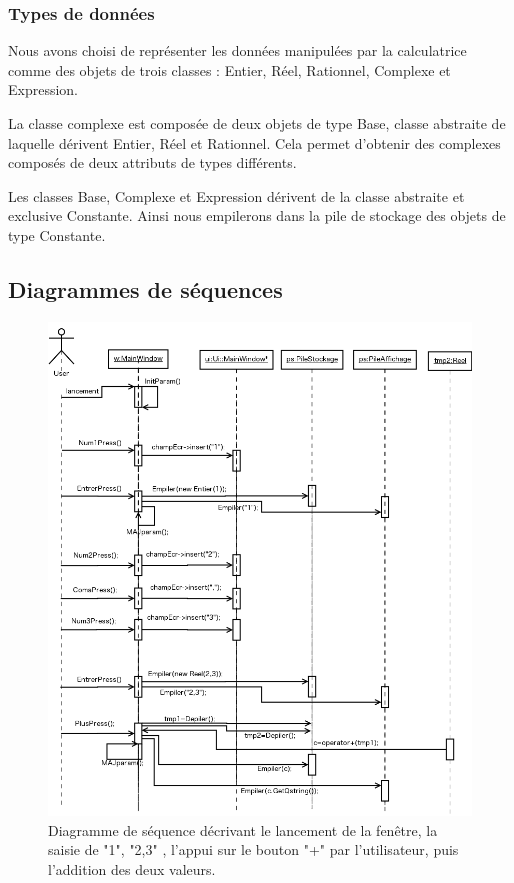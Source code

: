 \documentclass[a4paper,11pt]{article}
\begin{document}
\subsubsection{Types de données}
Nous avons choisi de représenter les données manipulées par la calculatrice comme des objets de trois classes : Entier, Réel, Rationnel, Complexe et Expression. 

La classe complexe est composée de deux objets de type Base, classe abstraite de laquelle dérivent Entier, Réel et Rationnel. Cela permet d'obtenir des complexes composés de deux attributs de types différents.

Les classes Base, Complexe et Expression dérivent de la classe abstraite et exclusive Constante. Ainsi nous empilerons dans la pile de stockage des objets de type Constante.


\subsection{Diagrammes de séquences}
\begin{figure}[H]
	\center
	\includegraphics[width=16.7cm]{diag_seq_1.png}
	\caption{Diagramme de séquence décrivant le lancement de la fenêtre, la saisie de "1", "2,3" , l'appui sur le bouton "+" par l'utilisateur, puis l'addition des deux valeurs.}
\end{figure}
\end{document}

